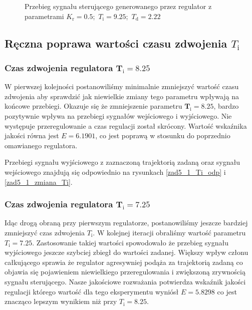 \begin{figure}[b]
    \centering
    \caption{Przebieg sygnału sterującego generowanego przez regulator z 
    parametrami \mbox{$K_{\mathrm{r}} = \num{0,5}$; $T_{\mathrm{i}} = \num{9,25}$; $T_{\mathrm{d}} = \num{2,22}$}}
    \label{zad5_3_zmiana_K}
\end{figure}
\FloatBarrier

\subsection{Ręczna poprawa wartości czasu zdwojenia $T_{\mathrm{i}}$ }
\label{zad5_poprawa_Ti}

\subsubsection{Czas zdwojenia regulatora $\mathbf{T_{\mathrm{i}}}=\num{8,25}$}
W pierwszej kolejności postanowiliśmy minimalnie zmniejszyć wartość czasu zdwojenia
aby sprawdzić jak niewielkie zmiany tego parametru wpływają na końcowe przebiegi.
Okazuje się że zmniejszenie parametru $\mathbf{T_{\mathrm{i}}}=\num{8,25}$, bardzo
pozytywnie wpływa na przebiegi sygnałów wejściowego i wyjściowego. Nie występuje przeregulowanie
a czas regulacji został skrócony. Wartość wskaźnika jakości równa jest $E = \num{6,1901}$, co jest poprawą
w stosunku do poprzednio omawianego regulatora.

Przebiegi sygnału wyjściowego z zaznaczoną trajektorią zadaną oraz sygnału wejściowego znajdują się 
odpowiednio na rysunkach \ref{zad5_1_Ti_odp} i \ref{zad5_1_zmiana_Ti}.

\subsubsection{Czas zdwojenia regulatora $\mathbf{T_{\mathrm{i}}}=\num{7,25}$}
Idąc drogą obraną przy pierwszym regulatorze, postanowiliśmy jeszcze bardziej zmniejszyć 
czas zdwojenia $T_{\mathrm{i}}$. W kolejnej iteracji obraliśmy wartość parametru
$T_{\mathrm{i}}=\num{7,25}$. Zastosowanie takiej wartości spowodowało że przebieg 
sygnału wyjściowego jeszcze szybciej zbiegł do wartości zadanej. Większy wpływ członu całkującego
sprawia że regulator agresywniej podąża za trajektorią zadaną co objawia się pojawieniem 
niewielkiego przeregulowania i zwiększoną zrywnością sygnału sterującego. Nasze jakościowe 
rozważania potwierdza wskaźnik jakości regulacji którego wartość dla tego eksperymentu
wyniósł $E=\num{5,8298}$ co jest znacząco lepszym wynikiem niż przy $T_{\mathrm{i}}=\num{8,25}$.

